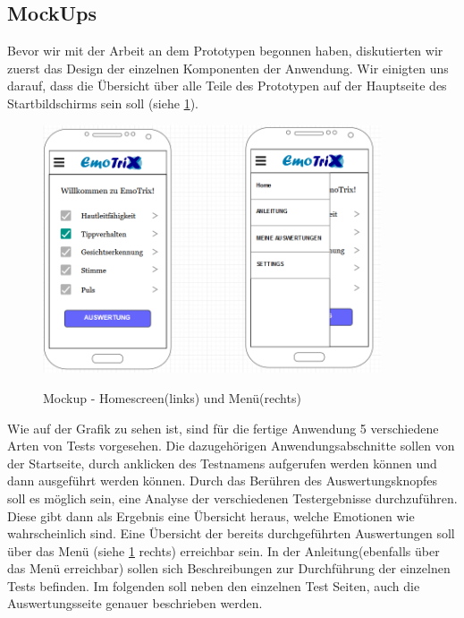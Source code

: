 \subsection{MockUps}
Bevor wir mit der Arbeit an dem Prototypen begonnen haben, diskutierten wir zuerst das Design der einzelnen Komponenten der Anwendung. Wir einigten uns darauf, dass die Übersicht über alle Teile des Prototypen auf der Hauptseite des Startbildschirms sein soll (siehe \ref{img:Mockup-Home}).
\begin{figure}[h]
	\centering
	\includegraphics[width=10cm]{Bilder/Mockup-Home.png}
	\label{img:Mockup-Home}
	\caption[Mockup - Homescreen(links) und Menü(rechts)]{Mockup - Homescreen(links) und Menü(rechts)}
\end{figure}%
Wie auf der Grafik zu sehen ist, sind für die fertige Anwendung 5 verschiedene Arten von Tests vorgesehen. Die dazugehörigen Anwendungsabschnitte sollen von der Startseite, durch anklicken des Testnamens aufgerufen werden können und dann ausgeführt werden können. Durch das Berühren des Auswertungsknopfes soll es möglich sein, eine Analyse der verschiedenen Testergebnisse durchzuführen. Diese gibt dann als Ergebnis eine Übersicht heraus, welche Emotionen wie wahrscheinlich sind. Eine Übersicht der bereits durchgeführten Auswertungen soll über das Menü (siehe \ref{img:Mockup-Home} rechts) erreichbar sein. In der Anleitung(ebenfalls über das Menü erreichbar) sollen sich Beschreibungen zur Durchführung der einzelnen Tests befinden.\newline
Im folgenden soll neben den einzelnen Test Seiten, auch die Auswertungsseite genauer beschrieben werden.

